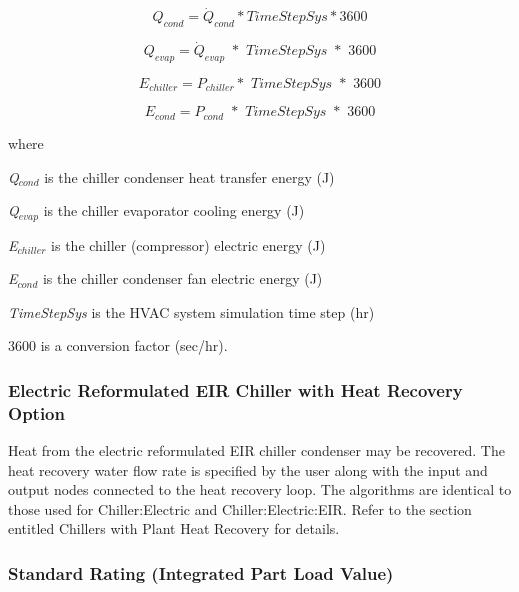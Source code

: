 \begin{equation}
{Q_{cond}} = {\dot{Q}_{cond}}*TimeStepSys*3600
\end{equation}

\begin{equation}
{Q_{evap}} = {\dot{Q}_{evap}}\,\,*\,\,TimeStepSys\,\,*\,\,3600
\end{equation}

\begin{equation}
{E_{chiller}} = {P_{chiller}}*\,\,TimeStepSys\,\,*\,\,3600
\end{equation}

\begin{equation}
{E_{cond}} = {P_{cond}}\,\, * \,\,TimeStepSys\,\,*\,\,3600
\end{equation}

where

\emph{Q\(_{cond}\)} is the chiller condenser heat transfer energy (J)

\emph{Q\(_{evap}\)} is the chiller evaporator cooling energy (J)

\emph{E\(_{chiller}\)} is the chiller (compressor) electric energy (J)

\emph{E\(_{cond}\)} is the chiller condenser fan electric energy (J)

\emph{TimeStepSys} is the HVAC system simulation time step (hr)

\(3600\) is a conversion factor (sec/hr).

\subsubsection{Electric Reformulated EIR Chiller with Heat Recovery Option}\label{electric-reformulated-eir-chiller-with-heat-recovery-option}

Heat from the electric reformulated EIR chiller condenser may be recovered. The heat recovery water flow rate is specified by the user along with the input and output nodes connected to the heat recovery loop. The algorithms are identical to those used for Chiller:Electric and Chiller:Electric:EIR. Refer to the section entitled Chillers with Plant Heat Recovery for details.

\subsubsection{Standard Rating (Integrated Part Load Value)}\label{standard-rating-integrated-part-load-value-1}

